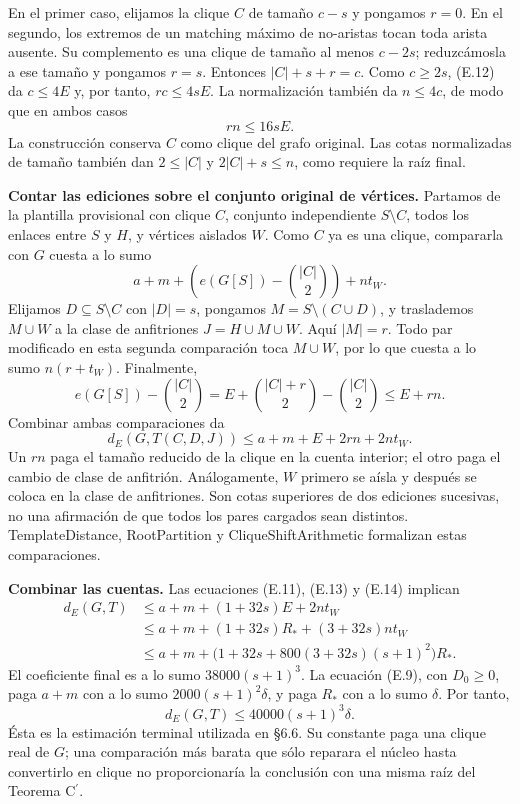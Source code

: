 \documentclass[spanish,11pt,a4paper]{article}
\begin{document}
En el primer caso, elijamos la clique \(C\) de tamaño \(c-s\) y pongamos \(r=0\). En el segundo, los extremos de un matching máximo de no-aristas tocan toda arista ausente. Su complemento es una clique de tamaño al menos \(c-2s\); reduzcámosla a ese tamaño y pongamos \(r=s\). Entonces \(|C|+s+r=c\). Como \(c\ge2s\), (E.12) da \(c\le4E\) y, por tanto, \(rc\le4sE\). La normalización también da \(n\le4c\), de modo que en ambos casos \[
rn\le16sE.
\tag{E.13}
\] La construcción conserva \(C\) como clique del grafo original. Las cotas normalizadas de tamaño también dan \(2\le|C|\) y \(2|C|+s\le n\), como requiere la raíz final.

\textbf{Contar las ediciones sobre el conjunto original de vértices.} Partamos de la plantilla provisional con clique \(C\), conjunto independiente \(S\setminus C\), todos los enlaces entre \(S\) y \(H\), y vértices aislados \(W\). Como \(C\) ya es una clique, compararla con \(G\) cuesta a lo sumo \[
a+m+\left(e(G[S])-\binom{|C|}{2}\right)+nt_W.
\] Elijamos \(D\subseteq S\setminus C\) con \(|D|=s\), pongamos \(M=S\setminus(C\cup D)\), y traslademos \(M\cup W\) a la clase de anfitriones \(J=H\cup M\cup W\). Aquí \(|M|=r\). Todo par modificado en esta segunda comparación toca \(M\cup W\), por lo que cuesta a lo sumo \(n(r+t_W)\). Finalmente, \[
e(G[S])-\binom{|C|}{2}
=E+\binom{|C|+r}{2}-\binom{|C|}{2}
\le E+rn.
\] Combinar ambas comparaciones da \[
d_E(G,T(C,D,J))\le a+m+E+2rn+2nt_W.
\tag{E.14}
\] Un \(rn\) paga el tamaño reducido de la clique en la cuenta interior; el otro paga el cambio de clase de anfitrión. Análogamente, \(W\) primero se aísla y después se coloca en la clase de anfitriones. Son cotas superiores de dos ediciones sucesivas, no una afirmación de que todos los pares cargados sean distintos. TemplateDistance, RootPartition y CliqueShiftArithmetic formalizan estas comparaciones.

\textbf{Combinar las cuentas.} Las ecuaciones (E.11), (E.13) y (E.14) implican \[
\begin{aligned}
d_E(G,T)&\le a+m+(1+32s)E+2nt_W\\
&\le a+m+(1+32s)R_*+(3+32s)nt_W\\
&\le a+m+\bigl(1+32s+800(3+32s)(s+1)^2\bigr)R_*.
\end{aligned}
\] El coeficiente final es a lo sumo \(38000(s+1)^3\). La ecuación (E.9), con \(D_0\ge0\), paga \(a+m\) con a lo sumo \(2000(s+1)^2\delta\), y paga \(R_*\) con a lo sumo \(\delta\). Por tanto, \[
d_E(G,T)\le40000(s+1)^3\delta.
\] Ésta es la estimación terminal utilizada en §6.6. Su constante paga una clique real de \(G\); una comparación más barata que sólo reparara el núcleo hasta convertirlo en clique no proporcionaría la conclusión con una misma raíz del Teorema \texorpdfstring{C\ensuremath{^{\prime}}}{C'}.
\end{document}
